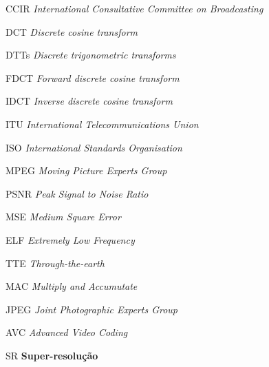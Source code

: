\begin{siglas}
  \item[CCIR] \textit{International Consultative Committee on Broadcasting}
  \item[DCT] \textit{Discrete cosine transform}
  \item[DTTs] \textit{Discrete trigonometric transforms}
  \item[FDCT] \textit{Forward discrete cosine transform} 
  \item[IDCT] \textit{Inverse discrete cosine transform} 
  \item[ITU] \textit{International Telecommunications Union}
  \item[ISO] \textit{International Standards Organisation}
  \item[MPEG] \textit{Moving Picture Experts Group}
  \item[PSNR] \textit{Peak Signal to Noise Ratio}
  \item[MSE] \textit{Medium Square Error}
  \item[ELF] \textit{Extremely Low Frequency}
  \item[TTE] \textit{Through-the-earth}
  \item[MAC] \textit{Multiply and Accumutate}
  \item[JPEG] \textit{Joint Photographic Experts Group}
  \item[AVC] \textit{Advanced Video Coding}
  \item[SR] \textbf{Super-resolução}
\end{siglas}
